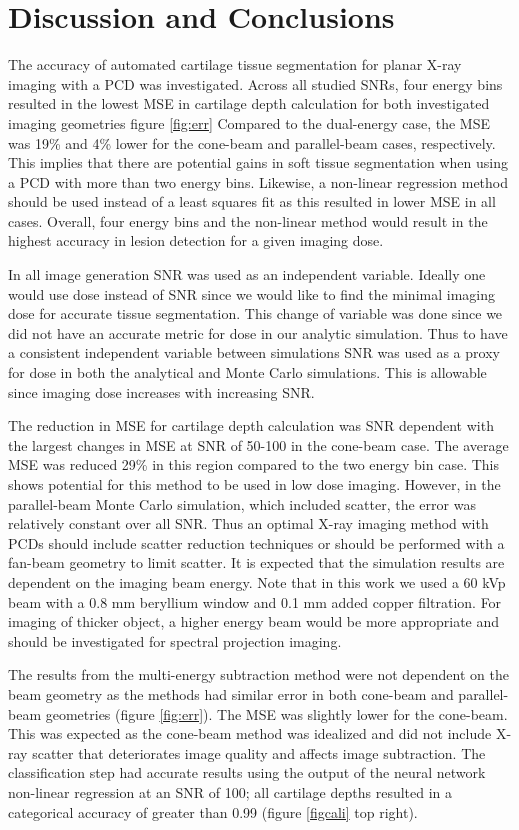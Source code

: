\documentclass[a4paper,11pt]{article}
\begin{document}
\section{Discussion and Conclusions}

The accuracy of automated cartilage tissue segmentation for planar X-ray imaging with a PCD was investigated. Across all studied SNRs, four energy bins resulted in the lowest MSE in cartilage depth calculation for both investigated imaging geometries 
figure \ref{fig:err} Compared to the dual-energy case, the MSE was 19\% and 4\% lower for the cone-beam and parallel-beam cases, respectively. This implies that there are potential gains in soft tissue segmentation when using a PCD with more than two energy bins. Likewise, a non-linear regression method should be used instead of a least squares fit as this resulted in lower MSE in all cases. Overall, four energy bins and the non-linear method would result in the highest accuracy in lesion detection for a given imaging dose.

In all image generation SNR was used as an independent variable. Ideally one would use dose instead of SNR since we would like to find the minimal imaging dose for accurate tissue segmentation. This change of variable was done since we did not have an accurate metric for dose in our analytic simulation. Thus to have a consistent independent variable between simulations SNR was used as a proxy for dose in both the analytical and Monte Carlo simulations. This is allowable since imaging dose increases with increasing SNR.

The reduction in MSE for cartilage depth calculation was SNR dependent with the largest changes in MSE at SNR of 50-100 in the cone-beam case. The average MSE was reduced 29\% in this region compared to the two energy bin case. This shows potential for this method to be used in low dose imaging. However, in the parallel-beam Monte Carlo simulation, which included scatter, the error was relatively constant over all SNR. Thus an optimal X-ray imaging method with PCDs should include scatter reduction techniques or should be performed with a fan-beam geometry to limit scatter. It is expected that the simulation results are dependent on the imaging beam energy. Note that in this work we used a 60 kVp beam with a 0.8 mm beryllium window and 0.1 mm added copper filtration. For imaging of thicker object, a higher energy beam would be more appropriate and should be investigated for spectral projection imaging.

The results from the multi-energy subtraction method were not dependent on the beam geometry as the methods had similar error in both cone-beam and parallel-beam geometries (figure \ref{fig:err}). The MSE was slightly lower for the cone-beam. This was expected as the cone-beam method was idealized and did not include X-ray scatter that deteriorates image quality and affects image subtraction. The classification step had accurate results using the output of the neural network non-linear regression at an SNR of 100; all cartilage depths resulted in a categorical accuracy of greater than 0.99 (figure \ref{figcali} top right). 
\end{document}
